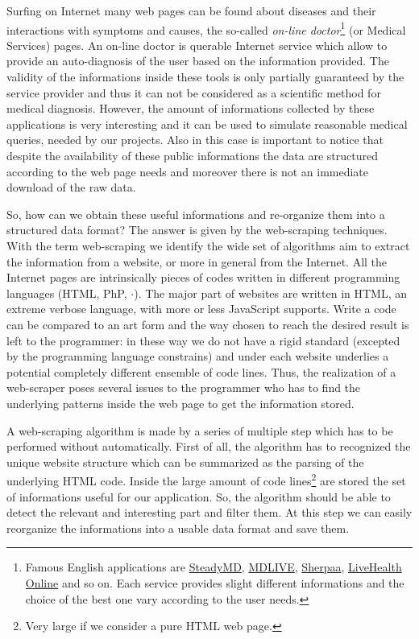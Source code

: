 \documentclass{standalone}
\begin{document}
Surfing on Internet many web pages can be found about diseases and their interactions with symptoms and causes, the so-called \emph{on-line doctor}\footnote{
  Famous English applications are \href{https://www.steadymd.com/?utm_source=bestonlinedoctors&utm_medium=partner&utm_campaign=bizdev}{SteadyMD}, \href{https://www.mdlive.com/}{MDLIVE}, \href{https://sherpaa.com/}{Sherpaa}, \href{https://livehealthonline.com/}{LiveHealth Online} and so on.
  Each service provides slight different informations and the choice of the best one vary according to the user needs.
} (or Medical Services) pages.
An on-line doctor is querable Internet service which allow to provide an auto-diagnosis of the user based on the information provided.
The validity of the informations inside these tools is only partially guaranteed by the service provider and thus it can not be considered as a scientific method for medical diagnosis.
However, the amount of informations collected by these applications is very interesting and it can be used to simulate reasonable medical queries, needed by our projects.
Also in this case is important to notice that despite the availability of these public informations the data are structured according to the web page needs and moreover there is not an immediate download of the raw data.

So, how can we obtain these useful informations and re-organize them into a structured data format?
The answer is given by the \textsf{web-scraping} techniques.
With the term \textsf{web-scraping} we identify the wide set of algorithms aim to extract the information from a website, or more in general from the Internet.
All the Internet pages are intrinsically pieces of codes written in different programming languages (HTML, PhP, $\cdot$).
The major part of websites are written in HTML, an extreme verbose language, with more or less JavaScript supports.
Write a code can be compared to an art form and the way chosen to reach the desired result is left to the programmer: in these way we do not have a rigid standard (excepted by the programming language constrains) and under each website underlies a potential completely different ensemble of code lines.
Thus, the realization of a web-scraper poses several issues to the programmer who has to find the underlying patterns inside the web page to get the information stored.

A web-scraping algorithm is made by a series of multiple step which has to be performed without automatically.
First of all, the algorithm has to recognized the unique website structure which can be summarized as the parsing of the underlying HTML code.
Inside the large amount of code lines\footnote{
  Very large if we consider a pure HTML web page.
} are stored the set of informations useful for our application.
So, the algorithm should be able to detect the relevant and interesting part and filter them.
At this step we can easily reorganize the informations into a usable data format and save them.
\end{document}
